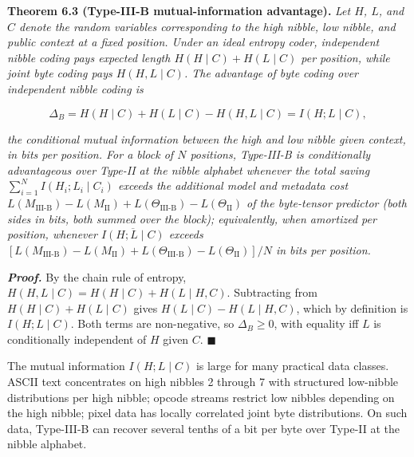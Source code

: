 \documentclass[
]{article}
\begin{document}
\textbf{Theorem 6.3 (Type-III-B mutual-information advantage).}
\emph{Let $H$, $L$, and $C$ denote the random variables corresponding
to the high nibble, low nibble, and public context at a fixed
position. Under an ideal entropy coder, independent nibble coding pays
expected length $H(H \mid C) + H(L \mid C)$ per position, while joint
byte coding pays $H(H, L \mid C)$. The advantage of byte coding over
independent nibble coding is}

\[
\Delta_B = H(H \mid C) + H(L \mid C) - H(H, L \mid C) = I(H ; L \mid C),
\tag{6.2}
\]

\emph{the conditional mutual information between the high and low
nibble given context, in bits per position. For a block of $N$
positions, Type-III-B is conditionally advantageous over Type-II at
the nibble alphabet whenever the total saving
$\sum_{i=1}^{N} I(H_i ; L_i \mid C_i)$ exceeds the additional model
and metadata cost
$L(M_{\mathrm{III\text{-}B}}) - L(M_{\mathrm{II}}) + L(\Theta_{\mathrm{III\text{-}B}}) - L(\Theta_{\mathrm{II}})$
of the byte-tensor predictor (both sides in bits, both summed over
the block); equivalently, when amortized per position, whenever
$\overline{I(H;L \mid C)}$ exceeds
$[L(M_{\mathrm{III\text{-}B}}) - L(M_{\mathrm{II}}) + L(\Theta_{\mathrm{III\text{-}B}}) - L(\Theta_{\mathrm{II}})] / N$
in bits per position.}

\emph{\textbf{Proof.}} By the chain rule of entropy,
$H(H, L \mid C) = H(H \mid C) + H(L \mid H, C)$. Subtracting from
$H(H \mid C) + H(L \mid C)$ gives $H(L \mid C) - H(L \mid H, C)$,
which by definition is $I(H ; L \mid C)$. Both terms are non-negative,
so $\Delta_B \geq 0$, with equality iff $L$ is conditionally
independent of $H$ given $C$. \hfill$\blacksquare$

The mutual information $I(H ; L \mid C)$ is large for many practical
data classes. ASCII text concentrates on high nibbles 2 through 7 with
structured low-nibble distributions per high nibble; opcode streams
restrict low nibbles depending on the high nibble; pixel data has
locally correlated joint byte distributions. On such data, Type-III-B
can recover several tenths of a bit per byte over Type-II at the
nibble alphabet.
\end{document}
